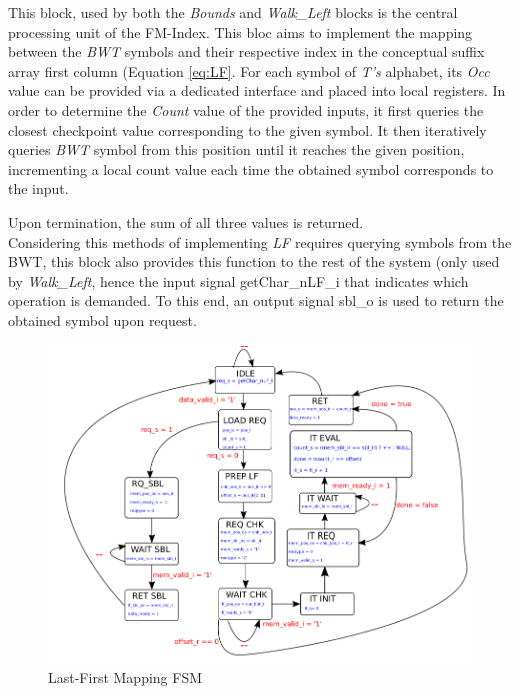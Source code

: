 This block, used by both the \textsl{Bounds} and \textsl{Walk\_Left} blocks is the central processing unit of the FM-Index. This bloc aims to implement the mapping between the \textsl{BWT} symbols and their respective index in the conceptual suffix array first column (Equation \ref{eq:LF}. For each symbol of \textsl{T's} alphabet, its \textsl{Occ} value can be provided via a dedicated interface and placed into local registers. In order to determine the \textsl{Count} value of the provided inputs, it first queries the closest checkpoint value corresponding to the given symbol. It then iteratively queries \textsl{BWT} symbol from this position until it reaches the given position, incrementing a local count value each time the obtained symbol corresponds to the input.

Upon termination, the sum of all three values is returned. \\

Considering this methods of implementing \textsl{LF} requires querying symbols from the BWT, this block also provides this function to the rest of the system (only used by \textsl{Walk\_Left}, hence the input signal \textrm{getChar\_nLF\_i} that indicates which operation is demanded. To this end, an output signal \textrm{sbl\_o} is used to return the obtained symbol upon request.

\begin{figure}[H]
    \centering
\hspace*{-20mm}\includegraphics[scale = 0.5]{Figures/LF_FSM.png}
    \caption{Last-First Mapping FSM}
    \label{fig:lf_fsm}
\end{figure}
\vspace*{8mm}



